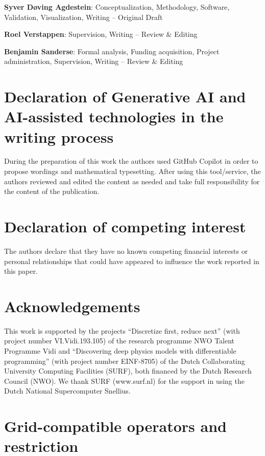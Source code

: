 \documentclass[preprint,twocolumn,5p]{elsarticle}
\begin{document}
\textbf{Syver Døving Agdestein}:
Conceptualization,
Methodology,
Software,
Validation,
Visualization,
Writing -- Original Draft

\textbf{Roel Verstappen}:
Supervision,
Writing -- Review \& Editing

\textbf{Benjamin Sanderse}:
Formal analysis,
Funding acquisition,
Project administration,
Supervision,
Writing -- Review \& Editing

\section*{Declaration of Generative AI and AI-assisted technologies in the writing process}


During the preparation of this work the authors used GitHub Copilot in order to
propose wordings and mathematical typesetting. After using this tool/service,
the authors reviewed and edited the content as needed and take full
responsibility for the content of the publication.

\section*{Declaration of competing interest}


The authors declare that they have no known competing financial interests or
personal relationships that could have appeared to influence the work reported
in this paper.

\section*{Acknowledgements}

This work is supported by the projects ``Discretize first, reduce next'' (with
project number VI.Vidi.193.105) of the research programme NWO Talent Programme
Vidi and ``Discovering deep physics models with differentiable programming''
(with project number EINF-8705) of the Dutch Collaborating University Computing
Facilities (SURF), both financed by the Dutch Research Council (NWO). We thank
SURF (www.surf.nl) for the support in using the Dutch National Supercomputer
Snellius.



\appendix

\section{Grid-compatible operators and restriction} \label{sec:grid-compatibility}
\end{document}
